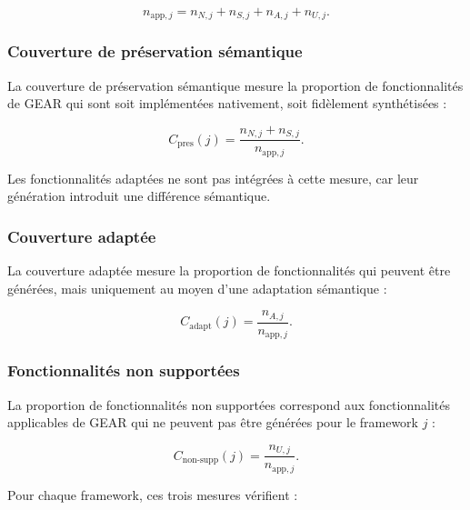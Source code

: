 \begin{equation}
n_{\mathrm{app},j}
=
n_{N,j}
+
n_{S,j}
+
n_{A,j}
+
n_{U,j}.
\label{eq:fonctionnalites-applicables}
\end{equation}


\subsubsection{Couverture de préservation sémantique}

La couverture de préservation sémantique mesure la proportion de
fonctionnalités de GEAR qui sont soit implémentées nativement, soit
fidèlement synthétisées :

\begin{equation}
C_{\mathrm{pres}}(j)
=
\frac{n_{N,j}+n_{S,j}}
     {n_{\mathrm{app},j}}.
\label{eq:couverture-preservation}
\end{equation}

Les fonctionnalités adaptées ne sont pas intégrées à cette mesure,
car leur génération introduit une différence sémantique.


\subsubsection{Couverture adaptée}

La couverture adaptée mesure la proportion de fonctionnalités qui
peuvent être générées, mais uniquement au moyen d'une adaptation
sémantique :

\begin{equation}
C_{\mathrm{adapt}}(j)
=
\frac{n_{A,j}}
     {n_{\mathrm{app},j}}.
\label{eq:couverture-adaptee}
\end{equation}


\subsubsection{Fonctionnalités non supportées}

La proportion de fonctionnalités non supportées correspond aux
fonctionnalités applicables de GEAR qui ne peuvent pas être générées
pour le framework $j$ :

\begin{equation}
C_{\mathrm{non\text{-}supp}}(j)
=
\frac{n_{U,j}}
     {n_{\mathrm{app},j}}.
\label{eq:couverture-non-supportee}
\end{equation}

Pour chaque framework, ces trois mesures vérifient :

